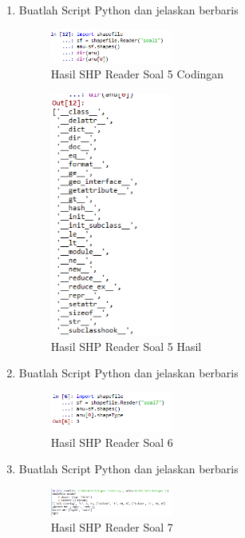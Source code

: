 \begin{enumerate}
    \item Buatlah Script Python dan jelaskan berbaris
    
    \hfill\break
    \begin{figure}[H]
		\includegraphics[width=4cm]{figures/1174004/3/5.png}
		\centering
		\caption{Hasil SHP Reader Soal 5 Codingan}
    \end{figure}

    \hfill\break
    \begin{figure}[H]
		\includegraphics[width=4cm]{figures/1174004/3/5ku.png}
		\centering
		\caption{Hasil SHP Reader Soal 5 Hasil}
    \end{figure}
    
    \item Buatlah Script Python dan jelaskan berbaris
    
    \hfill\break
    \begin{figure}[H]
		\includegraphics[width=4cm]{figures/1174004/3/6.png}
		\centering
		\caption{Hasil SHP Reader Soal 6}
    \end{figure}

    \item Buatlah Script Python dan jelaskan berbaris
    
    \hfill\break
    \begin{figure}[H]
		\includegraphics[width=4cm]{figures/1174004/3/7.png}
		\centering
		\caption{Hasil SHP Reader Soal 7}
    \end{figure}


\end{enumerate}
